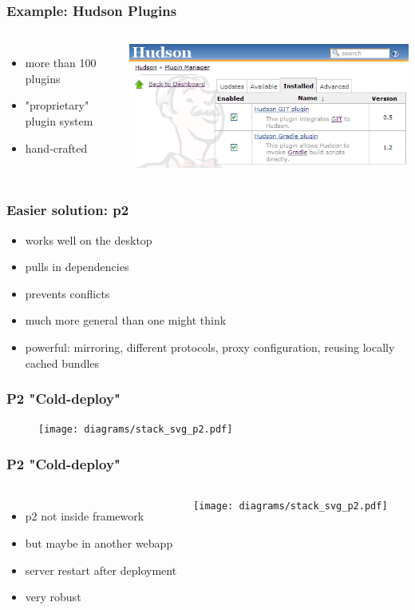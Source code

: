 \documentclass{beamer}
\begin{document}
\begin{frame}
  \frametitle{Example: Hudson Plugins}
\begin{columns}
\column{2in}
  \begin{itemize}
  \item more than 100 plugins\pause
  \item "proprietary" plugin system\pause
  \item hand-crafted\pause
  \end{itemize}   
\column{2.5in}
\includegraphics[width=1.0\textwidth]{hudson.png}
\end{columns}
\end{frame}


\begin{frame}
  \frametitle{Easier solution: p2}
  \begin{itemize}
  \item works well on the desktop\pause
  \item pulls in dependencies\pause
  \item prevents conflicts\pause
  \item much more general than one might think\pause
  \item powerful: mirroring, different protocols, proxy configuration, reusing locally cached bundles
  \end{itemize}   
\end{frame}

\begin{frame}
  \frametitle{P2 "Cold-deploy"}
\begin{figure}
   \texttt{[image: diagrams/stack\_svg\_p2.pdf]}
\end{figure}
\end{frame}

\begin{frame}
  \frametitle{P2 "Cold-deploy"}
\begin{columns}
\column{2in}
  \begin{itemize}
  \item p2 not inside framework\pause
  \item but maybe in another webapp\pause
  \item server restart after deployment\pause
  \item very robust
  \end{itemize}      
\column{2.5in}
\texttt{[image: diagrams/stack\_svg\_p2.pdf]}
\end{columns}
\end{frame}
\end{document}
